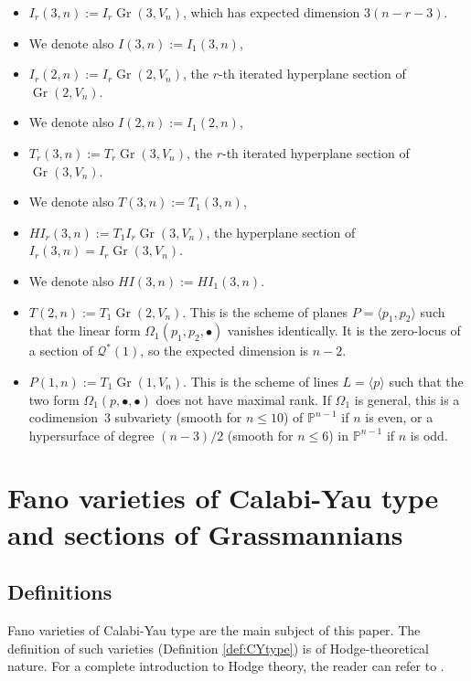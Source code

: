 \documentclass[JEP,XML,SOM,Unicode,NoEqCountersInSection]{cedram}
\newcommand{\sbullet}{{\scriptstyle\bullet}}
\let\mathcal\mathscr
\theoremstyle{plain}
\theoremstyle{definition}
\DeclareMathOperator{\Gr}{Gr}
\newcommand{\PP}{\mathbb{P}}
\newcommand{\sheaf}[1]{\mathcal{#1}}
\newcommand{\kq}{\sheaf{Q}}
\begin{document}
\begin{itemize}
\item $I_r(3,n):= I_r \Gr(3,V_n)$, which has expected dimension $3(n-r-3)$.
\item[] We denote also $I(3,n):=I_1(3,n)$,
\item $I_r(2,n):= I_r \Gr(2,V_n)$, the $r$-th iterated hyperplane section of $\Gr(2,V_n)$.
\item[] We denote also $I(2,n):=I_1(2,n)$,
\item $T_r(3,n):= T_r \Gr(3,V_n)$, the $r$-th iterated hyperplane section of $\Gr(3,V_n)$.
\item[]We denote also $T(3,n):=T_1(3,n)$,
\item $HI_r(3,n):= T_1 I_r \Gr(3,V_n)$, the hyperplane section of $I_r(3,n)=I_r\Gr(3,V_n)$.
\item[]We denote also $HI(3,n):=HI_1(3,n)$.
\item $T(2,n):= T_1 \Gr(2,V_n)$. This is the scheme of planes $P=\langle p_1, p_2\rangle$ such that
the linear form $\Omega_1(p_1, p_2,\sbullet)$ vanishes identically. It is the zero-locus of a section of
$\kq^* (1)$, so the expected dimension is $n-2$.
\item $P(1,n):= T_1 \Gr(1,V_n)$. This is the scheme of lines $L=\langle p\rangle$ such that the
two form $\Omega_1(p,\sbullet,\sbullet)$ does not have maximal rank. If $\Omega_1$ is general,
this is a codimension~$3$ subvariety (smooth for $n\leq 10$) of $\PP^{n-1}$ if $n$ is even, or a
hypersurface of degree $(n-3)/2$ (smooth for $n \leq 6$) in $\PP^{n-1}$ if $n$ is odd.
\end{itemize}

\section{Fano varieties of Calabi-Yau type and sections of Grassmannians}\label{sec:CYtype}

\subsection{Definitions}
Fano varieties of Calabi-Yau type are the main subject of this paper. The definition
of such varieties (Definition \ref{def:CYtype}) is of Hodge-theoretical nature.
For a complete introduction to Hodge theory, the reader can refer to \cite{voisin-book}.
\end{document}
